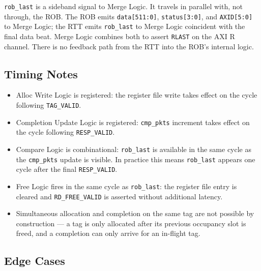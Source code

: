 \texttt{rob\_last} is a sideband signal to Merge Logic. It travels in
parallel with, not through, the ROB. The ROB emits
\texttt{data[511:0]}, \texttt{status[3:0]}, and \texttt{AXID[5:0]} to
Merge Logic; the RTT emits \texttt{rob\_last} to Merge Logic
coincident with the final data beat. Merge Logic combines both to
assert \texttt{RLAST} on the AXI R channel. There is no feedback path
from the RTT into the ROB's internal logic.

\subsection{Timing Notes}

\begin{itemize}
  \item Alloc Write Logic is registered: the register file write takes
        effect on the cycle following \texttt{TAG\_VALID}.
  \item Completion Update Logic is registered: \texttt{cmp\_pkts}
        increment takes effect on the cycle following \texttt{RESP\_VALID}.
  \item Compare Logic is combinational: \texttt{rob\_last} is available
        in the same cycle as the \texttt{cmp\_pkts} update is visible.
        In practice this means \texttt{rob\_last} appears one cycle
        after the final \texttt{RESP\_VALID}.
  \item Free Logic fires in the same cycle as \texttt{rob\_last}:
        the register file entry is cleared and \texttt{RD\_FREE\_VALID}
        is asserted without additional latency.
  \item Simultaneous allocation and completion on the same tag are not
        possible by construction — a tag is only allocated after its
        previous occupancy slot is freed, and a completion can only
        arrive for an in-flight tag.
\end{itemize}

\subsection{Edge Cases}


